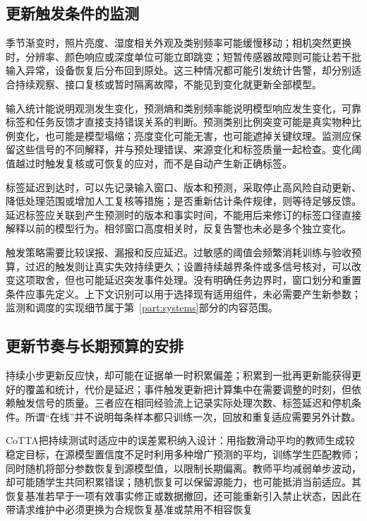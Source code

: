 \subsection{更新触发条件的监测}
\label{sec:ket-update-monitoring}

季节渐变时，照片亮度、湿度相关外观及类别频率可能缓慢移动；相机突然更换时，分辨率、颜色响应或深度单位可能立即跳变；短暂传感器故障则可能让若干批输入异常，设备恢复后分布回到原处。这三种情况都可能引发统计告警，却分别适合持续观察、接口复核或暂时隔离故障，不能见到变化就更新全部模型。

输入统计能说明观测发生变化，预测熵和类别频率能说明模型响应发生变化，可靠标签和任务反馈才直接支持错误关系的判断。预测类别比例突变可能是真实物种比例变化，也可能是模型塌缩；亮度变化可能无害，也可能遮掉关键纹理。监测应保留这些信号的不同解释，并与预处理错误、来源变化和标签质量一起检查。变化阈值越过时触发复核或可恢复的应对，而不是自动产生新正确标签。

标签延迟到达时，可以先记录输入窗口、版本和预测，采取停止高风险自动更新、降低处理范围或增加人工复核等措施；是否重新估计条件规律，则等待足够反馈。延迟标签应关联到产生预测时的版本和事实时间，不能用后来修订的标签口径直接解释以前的模型行为。相邻窗口高度相关时，反复告警也未必是多个独立变化。

触发策略需要比较误报、漏报和反应延迟。过敏感的阈值会频繁消耗训练与验收预算，过迟的触发则让真实失效持续更久；设置持续越界条件或多信号核对，可以改变这项取舍，但也可能延迟突发事件处理。没有明确任务边界时，窗口划分和重置条件应事先定义。上下文识别可以用于选择现有适用组件，未必需要产生新参数；监测和调度的实现细节属于第~\ref{part:systems}部分的内容范围。

\subsection{更新节奏与长期预算的安排}
\label{sec:ket-update-budget}

持续小步更新反应快，却可能在证据单一时积累偏差；积累到一批再更新能获得更好的覆盖和统计，代价是延迟；事件触发更新把计算集中在需要调整的时刻，但依赖触发信号的质量。三者应在相同经验流上记录实际处理次数、标签延迟和停机条件。所谓“在线”并不说明每条样本都只训练一次，回放和重复适应需要另外计数。

CoTTA把持续测试时适应中的误差累积纳入设计：用指数滑动平均的教师生成较稳定目标，在源模型置信度不足时利用多种增广预测的平均，训练学生匹配教师；同时随机将部分参数恢复到源模型值，以限制长期偏离。教师平均减弱单步波动，却可能随学生共同积累错误；随机恢复可以保留源能力，也可能抵消当前适应。其恢复基准若早于一项有效事实修正或数据撤回，还可能重新引入禁止状态，因此在带请求维护中必须更换为合规恢复基准或禁用不相容恢复


